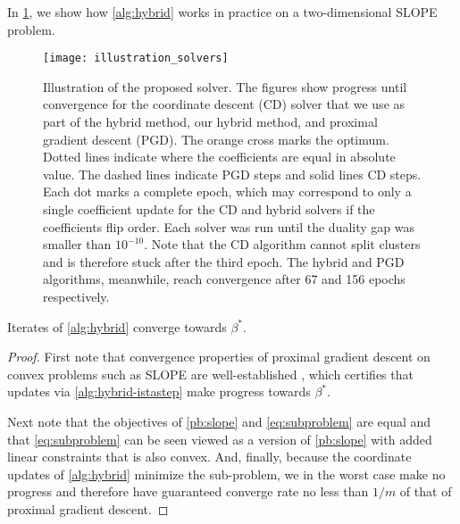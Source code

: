 In \cref{fig:illustration-solver}, we show how \cref{alg:hybrid} works in practice on
a two-dimensional SLOPE problem.

\begin{figure}[htbp]
  \centering
  \texttt{[image: illustration\_solvers]}
  \caption{Illustration of the proposed solver. The figures show progress
    until convergence for the coordinate descent (CD) solver that we use as part
    of the hybrid method, our hybrid method, and  proximal gradient descent
    (PGD). The orange cross marks the optimum. Dotted lines indicate where the
    coefficients are equal in absolute value. The dashed lines indicate PGD
    steps and solid lines CD steps. Each dot marks a complete epoch, which may
    correspond to only a single coefficient update for the CD and hybrid
    solvers if the coefficients flip order. Each solver was run until the duality
    gap was smaller than \(10^{-10}\). Note that the CD algorithm cannot split clusters
    and is therefore stuck after the third epoch. The hybrid and PGD algorithms,
    meanwhile, reach convergence after 67 and 156 epochs respectively.}
  \label{fig:illustration-solver}
\end{figure}

\begin{theorem}
  Iterates of \cref{alg:hybrid} converge towards \(\beta^*\).
\end{theorem}
\begin{proof}
  First note that convergence properties of proximal gradient descent on convex
  problems such as SLOPE are well-established
  \parencite{beck2009,daubechies2004}, which certifies that updates via
  \cref{alg:hybrid-istastep} make progress towards \(\beta^*\).

  Next note that the objectives of \eqref{pb:slope} and
  \eqref{eq:subproblem} are equal and that \eqref{eq:subproblem} can be seen
  viewed as a version of \eqref{pb:slope} with added linear constraints
  that is also convex. And, finally, because the coordinate updates of
  \cref{alg:hybrid} minimize the sub-problem, we in the worst case make no
  progress and therefore have guaranteed converge rate no less than \(1/m\)
  of that of proximal gradient descent.
\end{proof}

